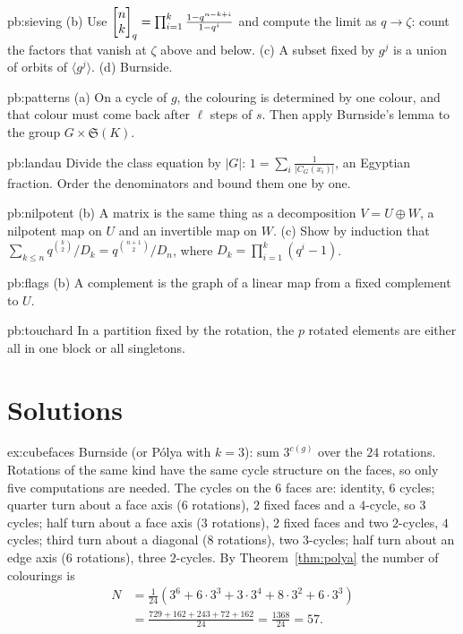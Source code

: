 \begin{hint}{pb:sieving}
(b) Use $\begin{bmatrix}n\\k\end{bmatrix}_q=\prod_{i=1}^k\frac{1-q^{n-k+i}}{1-q^i}$ and compute the limit as $q\to\zeta$: count the factors that
vanish at $\zeta$ above and below. (c) A subset fixed by $g^j$ is a union of orbits of $\langle g^j\rangle$. (d) Burnside.
\end{hint}

\begin{hint}{pb:patterns}
(a) On a cycle of $g$, the colouring is determined by one colour, and that colour must come back after $\ell$ steps of $s$.
Then apply Burnside's lemma to the group $G\times\mathfrak S(K)$.
\end{hint}

\begin{hint}{pb:landau}
Divide the class equation by $|G|$: $1=\sum_i\frac1{|C_G(x_i)|}$, an Egyptian fraction. Order the denominators and bound
them one by one.
\end{hint}

\begin{hint}{pb:nilpotent}
(b) A matrix is the same thing as a decomposition $V=U\oplus W$, a nilpotent map on $U$ and an invertible map on $W$. (c) Show
by induction that $\sum_{k\le n}q^{\binom k2}/D_k=q^{\binom{n+1}2}/D_n$, where $D_k=\prod_{i=1}^k(q^i-1)$.
\end{hint}

\begin{hint}{pb:flags}
(b) A complement is the graph of a linear map from a fixed complement to $U$.
\end{hint}

\begin{hint}{pb:touchard}
In a partition fixed by the rotation, the $p$ rotated elements are either all in one block or all singletons.
\end{hint}

\section{Solutions}

\begin{solution}{ex:cubefaces}
\idea Burnside (or P\'olya with $k=3$): sum $3^{c(g)}$ over the $24$ rotations. Rotations of the same kind have the same cycle structure on the faces, so only five computations are needed.
\writeup The cycles on the $6$ faces are: identity, $6$ cycles; quarter turn about a face axis ($6$ rotations), $2$ fixed faces and a $4$-cycle, so $3$ cycles; half turn about a face axis ($3$ rotations), $2$ fixed faces and two $2$-cycles, $4$ cycles; third turn about a diagonal ($8$ rotations), two $3$-cycles; half turn about an edge axis ($6$ rotations), three $2$-cycles. By Theorem~\ref{thm:polya} the number of colourings is
\[
\begin{aligned}
N&=\frac1{24}\left(3^6+6\cdot3^3+3\cdot3^4+8\cdot3^2+6\cdot3^3\right)\\
&=\frac{729+162+243+72+162}{24}=\frac{1368}{24}=57.
\end{aligned}
\]
\end{solution}

